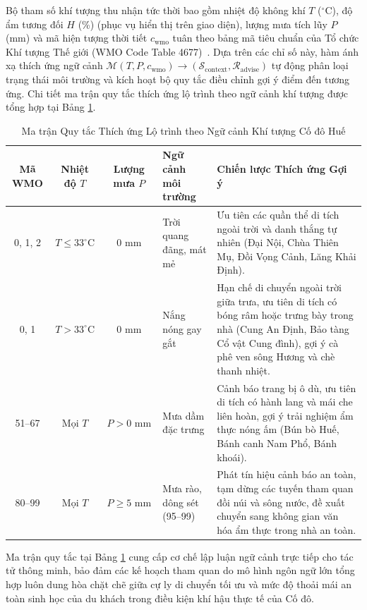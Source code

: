 Bộ tham số khí tượng thu nhận tức thời bao gồm nhiệt độ không khí $T$ ($^\circ\text{C}$), độ ẩm tương đối $H$ (\%) (phục vụ hiển thị trên giao diện), lượng mưa tích lũy $P$ (mm) và mã hiện tượng thời tiết $c_{\text{wmo}}$ tuân theo bảng mã tiêu chuẩn của Tổ chức Khí tượng Thế giới (WMO Code Table 4677)~\cite{wmo2019codes}. Dựa trên các chỉ số này, hàm ánh xạ thích ứng ngữ cảnh $\mathcal{M}(T, P, c_{\text{wmo}}) \to (\mathcal{S}_{\text{context}}, \mathcal{R}_{\text{advise}})$ tự động phân loại trạng thái môi trường và kích hoạt bộ quy tắc điều chỉnh gợi ý điểm đến tương ứng. Chi tiết ma trận quy tắc thích ứng lộ trình theo ngữ cảnh khí tượng được tổng hợp tại Bảng \ref{tab:weather-rules}.

\begin{table}[htbp]
\centering
\caption{Ma trận Quy tắc Thích ứng Lộ trình theo Ngữ cảnh Khí tượng Cố đô Huế}
\label{tab:weather-rules}
\footnotesize
\singlespacing
\renewcommand{\arraystretch}{1.0}
\begin{tabularx}{\textwidth}{c c c p{2.8cm} X}
\hline
\textbf{Mã WMO} & \textbf{Nhiệt độ $T$} & \textbf{Lượng mưa $P$} & \textbf{Ngữ cảnh môi trường} & \textbf{Chiến lược Thích ứng Gợi ý} \\
\hline
0, 1, 2 & $T \le 33^\circ\text{C}$ & $0\text{ mm}$ & Trời quang đãng, mát mẻ & Ưu tiên các quần thể di tích ngoài trời và danh thắng tự nhiên (Đại Nội, Chùa Thiên Mụ, Đồi Vọng Cảnh, Lăng Khải Định). \\
0, 1 & $T > 33^\circ\text{C}$ & $0\text{ mm}$ & Nắng nóng gay gắt & Hạn chế di chuyển ngoài trời giữa trưa, ưu tiên di tích có bóng râm hoặc trưng bày trong nhà (Cung An Định, Bảo tàng Cổ vật Cung đình), gợi ý cà phê ven sông Hương và chè thanh nhiệt. \\
51--67 & Mọi $T$ & $P > 0\text{ mm}$ & Mưa dầm đặc trưng & Cảnh báo trang bị ô dù, ưu tiên di tích có hành lang và mái che liên hoàn, gợi ý trải nghiệm ẩm thực nóng ấm (Bún bò Huế, Bánh canh Nam Phổ, Bánh khoái). \\
80--99 & Mọi $T$ & $P \ge 5\text{ mm}$ & Mưa rào, dông sét (95--99) & Phát tín hiệu cảnh báo an toàn, tạm dừng các tuyến tham quan đồi núi và sông nước, đề xuất chuyển sang không gian văn hóa ẩm thực trong nhà an toàn. \\
\hline
\end{tabularx}
\end{table}

Ma trận quy tắc tại Bảng \ref{tab:weather-rules} cung cấp cơ chế lập luận ngữ cảnh trực tiếp cho tác tử thông minh, bảo đảm các kế hoạch tham quan do mô hình ngôn ngữ lớn tổng hợp luôn dung hòa chặt chẽ giữa cự ly di chuyển tối ưu và mức độ thoải mái an toàn sinh học của du khách trong điều kiện khí hậu thực tế của Cố đô.

